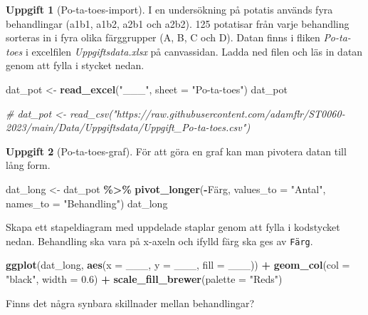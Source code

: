 \documentclass[
]{book}
\newenvironment{Shaded}{\begin{snugshade}}{\end{snugshade}}
\newcommand{\AttributeTok}[1]{\textcolor[rgb]{0.13,0.29,0.53}{#1}}
\newcommand{\CommentTok}[1]{\textcolor[rgb]{0.56,0.35,0.01}{\textit{#1}}}
\newcommand{\FloatTok}[1]{\textcolor[rgb]{0.00,0.00,0.81}{#1}}
\newcommand{\FunctionTok}[1]{\textcolor[rgb]{0.13,0.29,0.53}{\textbf{#1}}}
\newcommand{\NormalTok}[1]{#1}
\newcommand{\OtherTok}[1]{\textcolor[rgb]{0.56,0.35,0.01}{#1}}
\newcommand{\SpecialCharTok}[1]{\textcolor[rgb]{0.81,0.36,0.00}{\textbf{#1}}}
\newcommand{\StringTok}[1]{\textcolor[rgb]{0.31,0.60,0.02}{#1}}
\theoremstyle{definition}
\theoremstyle{definition}
\theoremstyle{definition}
\newtheorem{exercise}{Uppgift}[chapter]
\theoremstyle{definition}
\theoremstyle{remark}
\begin{document}
\begin{exercise}[Po-ta-toes-import]

I en undersökning på potatis används fyra behandlingar (a1b1, a1b2, a2b1 och a2b2). 125 potatisar från varje behandling sorteras in i fyra olika färggrupper (A, B, C och D). Datan finns i fliken \emph{Po-ta-toes} i excelfilen \emph{Uppgiftsdata.xlsx} på canvassidan. Ladda ned filen och läs in datan genom att fylla i stycket nedan.

\begin{Shaded}
\begin{Highlighting}[]
\NormalTok{dat\_pot }\OtherTok{\textless{}{-}} \FunctionTok{read\_excel}\NormalTok{(}\StringTok{"\_\_\_"}\NormalTok{, }\AttributeTok{sheet =} \StringTok{"Po{-}ta{-}toes"}\NormalTok{)}
\NormalTok{dat\_pot}

\CommentTok{\# dat\_pot \textless{}{-} read\_csv("https://raw.githubusercontent.com/adamflr/ST0060{-}2023/main/Data/Uppgiftsdata/Uppgift\_Po{-}ta{-}toes.csv")}
\end{Highlighting}
\end{Shaded}

\end{exercise}

\begin{exercise}[Po-ta-toes-graf]
För att göra en graf kan man pivotera datan till lång form.

\begin{Shaded}
\begin{Highlighting}[]
\NormalTok{dat\_long }\OtherTok{\textless{}{-}}\NormalTok{ dat\_pot }\SpecialCharTok{\%\textgreater{}\%} \FunctionTok{pivot\_longer}\NormalTok{(}\SpecialCharTok{{-}}\NormalTok{Färg, }\AttributeTok{values\_to =} \StringTok{"Antal"}\NormalTok{, }\AttributeTok{names\_to =} \StringTok{"Behandling"}\NormalTok{)}
\NormalTok{dat\_long}
\end{Highlighting}
\end{Shaded}

Skapa ett stapeldiagram med uppdelade staplar genom att fylla i kodstycket nedan. Behandling ska vara på x-axeln och ifylld färg ska ges av \texttt{Färg}.

\begin{Shaded}
\begin{Highlighting}[]
\FunctionTok{ggplot}\NormalTok{(dat\_long, }\FunctionTok{aes}\NormalTok{(}\AttributeTok{x =}\NormalTok{ \_\_\_, }\AttributeTok{y =}\NormalTok{ \_\_\_, }\AttributeTok{fill =}\NormalTok{ \_\_\_)) }\SpecialCharTok{+}
  \FunctionTok{geom\_col}\NormalTok{(}\AttributeTok{col =} \StringTok{"black"}\NormalTok{, }\AttributeTok{width =} \FloatTok{0.6}\NormalTok{) }\SpecialCharTok{+}
  \FunctionTok{scale\_fill\_brewer}\NormalTok{(}\AttributeTok{palette =} \StringTok{"Reds"}\NormalTok{)}
\end{Highlighting}
\end{Shaded}

Finns det några synbara skillnader mellan behandlingar?
\end{exercise}
\end{document}
